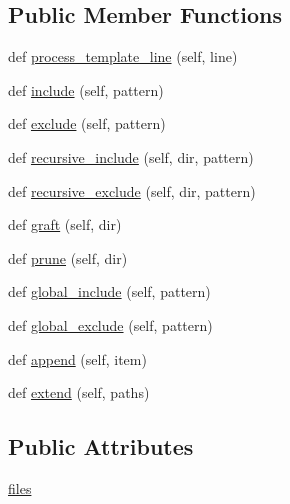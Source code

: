 \subsection*{Public Member Functions}
\begin{DoxyCompactItemize}
\item 
def \hyperlink{classsetuptools_1_1command_1_1egg__info_1_1FileList_a4c2fa3fbb3484337650be82c173d06bf}{process\+\_\+template\+\_\+line} (self, line)
\item 
def \hyperlink{classsetuptools_1_1command_1_1egg__info_1_1FileList_ae1210c8390f0b9722db42fb320e1eb05}{include} (self, pattern)
\item 
def \hyperlink{classsetuptools_1_1command_1_1egg__info_1_1FileList_a4ceece8c1628a9e1dfc346f597236ea6}{exclude} (self, pattern)
\item 
def \hyperlink{classsetuptools_1_1command_1_1egg__info_1_1FileList_a287e9bf1901bbc7fe07e6018227e8493}{recursive\+\_\+include} (self, dir, pattern)
\item 
def \hyperlink{classsetuptools_1_1command_1_1egg__info_1_1FileList_adf73c4c0b091249abfe3f353b3c5e31b}{recursive\+\_\+exclude} (self, dir, pattern)
\item 
def \hyperlink{classsetuptools_1_1command_1_1egg__info_1_1FileList_a3a7407577c491ca328677532b0a67264}{graft} (self, dir)
\item 
def \hyperlink{classsetuptools_1_1command_1_1egg__info_1_1FileList_aeca88a33bf21b70a8d6adec507704468}{prune} (self, dir)
\item 
def \hyperlink{classsetuptools_1_1command_1_1egg__info_1_1FileList_a37479fbd5d06a6abedea2c8914754735}{global\+\_\+include} (self, pattern)
\item 
def \hyperlink{classsetuptools_1_1command_1_1egg__info_1_1FileList_af536ad4a0fc2c5a6f2499255a50429ed}{global\+\_\+exclude} (self, pattern)
\item 
def \hyperlink{classsetuptools_1_1command_1_1egg__info_1_1FileList_a8f5c1a299b05cc91a266116514a841c5}{append} (self, item)
\item 
def \hyperlink{classsetuptools_1_1command_1_1egg__info_1_1FileList_a1fc25e5103545c7a0fbb613b72cc89e6}{extend} (self, paths)
\end{DoxyCompactItemize}
\subsection*{Public Attributes}
\begin{DoxyCompactItemize}
\item 
\hyperlink{classsetuptools_1_1command_1_1egg__info_1_1FileList_a5f5f8c4a6db4580cf53125d54a15d75a}{files}
\end{DoxyCompactItemize}


